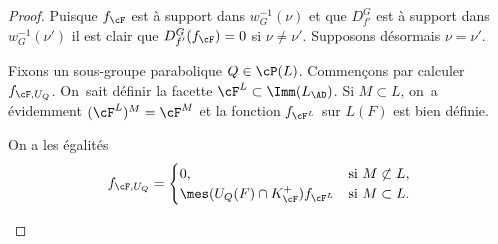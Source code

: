 \begin{proof}
Puisque $f_{\cF}$ est à support dans $w_{G}^{-1}(\nu)$ et que $D^G_{f'}$ est à support dans $w_{G}^{-1}(\nu')$ il est clair que $D^G_{f'}(f_{\cF})=0$ si $\nu\neq\nu'$. Supposons désormais $\nu=\nu'$.

Fixons un sous-groupe parabolique $Q\in \cP(L)$. Commençons par calculer $f_{\cF,U_{Q}}$. On~sait définir la facette $\cF^L\subset \Imm(L_{\AD})$. Si $M\subset L$, on~a évidemment $(\cF^L)^M=\cF^M$ et la fonction $f_{\cF^L}$ sur $L(F)$ est bien définie.

\begin{lem}\label{lem1}
On a les égalités
\[
f_{\cF,U_{Q}}=\begin{cases}0,&\text{si } M\not\subset L,\\
\mes(U_{Q}(F)\cap K_{\cF}^+)f_{\cF^L}&\text{si } M\subset L. \end{cases}
\]
\end{lem}


\end{proof}
